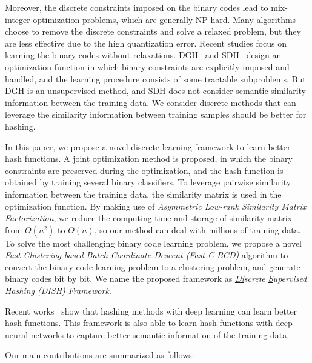\documentclass[conference]{IEEEtran}
\begin{document}
Moreover, the discrete constraints imposed on the binary codes lead to mix-integer optimization problems, which are generally NP-hard. Many algorithms choose to remove the discrete constraints and solve a relaxed problem, but they are less effective due to the high quantization error. Recent studies focus on learning the binary codes without relaxations. DGH~\cite{liu2014discrete} and SDH~\cite{Shen_2015_CVPR} design an optimization function in which binary constraints are explicitly imposed and handled, and the learning procedure consists of some tractable subproblems. But DGH is an unsupervised method, and SDH does not consider semantic similarity information between the training data. We consider discrete methods that can leverage the similarity information between training samples should be better for hashing.

In this paper, we propose a novel discrete learning framework to learn better hash functions. A joint optimization method is proposed, in which the binary constraints are preserved during the optimization, and the hash function is obtained by training several binary classifiers. To leverage pairwise similarity information between the training data, the similarity matrix is used in the optimization function. By making use of {\em Asymmetric Low-rank Similarity Matrix Factorization}, we reduce the computing time and storage of similarity matrix from $O(n^2)$ to $O(n)$, so our method can deal with millions of training data. To solve the most challenging binary code learning problem, we propose a novel {\em Fast Clustering-based Batch Coordinate Descent (Fast C-BCD)} algorithm to convert the binary code learning problem to a clustering problem, and generate binary codes bit by bit. We name the proposed framework as {\em \underline{Di}screte \underline{S}upervised \underline{H}ashing (DISH) Framework}.

Recent works~\cite{xia2014supervised,lai2015simultaneous,guo2016hash,zhu2016deep} show that hashing methods with deep learning can learn better hash functions. This framework is also able to learn hash functions with deep neural networks to capture better semantic information of the training data.

Our main contributions are summarized as follows:
\end{document}
